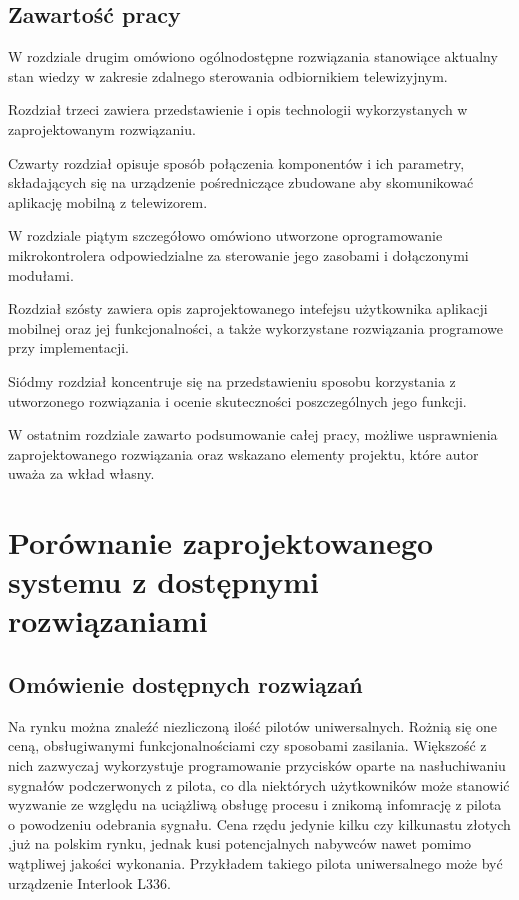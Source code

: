 \documentclass[12pt,twoside,draft]{article}
\begin{document}
\subsection{Zawartość pracy}
W rozdziale drugim  omówiono ogólnodostępne rozwiązania stanowiące aktualny stan wiedzy w zakresie zdalnego sterowania odbiornikiem telewizyjnym.

Rozdział trzeci zawiera przedstawienie i opis technologii wykorzystanych w zaprojektowanym rozwiązaniu.

Czwarty rozdział opisuje sposób połączenia komponentów i ich parametry, składających się na urządzenie pośredniczące zbudowane aby skomunikować aplikację mobilną z telewizorem.

W rozdziale piątym szczegółowo omówiono utworzone oprogramowanie mikrokontrolera odpowiedzialne za sterowanie jego zasobami i dołączonymi modułami.

Rozdział szósty zawiera opis zaprojektowanego intefejsu użytkownika aplikacji mobilnej oraz jej funkcjonalności, a także wykorzystane rozwiązania programowe przy implementacji.

Siódmy rozdział koncentruje się na przedstawieniu sposobu korzystania z utworzonego rozwiązania i ocenie skuteczności poszczególnych jego funkcji.

W ostatnim rozdziale zawarto podsumowanie całej pracy, możliwe usprawnienia zaprojektowanego rozwiązania oraz wskazano elementy projektu, które autor uważa za wkład własny.


\clearpage
\section{Porównanie zaprojektowanego systemu z do\-stęp\-ny\-mi rozwiązaniami}
\subsection{Omówienie dostępnych rozwiązań}
Na rynku można znaleźć niezliczoną ilość pilotów uniwersalnych. Rożnią się one
ceną, obsługiwanymi funkcjonalnościami czy sposobami zasilania. Większość z nich zazwyczaj
wykorzystuje programowanie przycisków oparte na nasłuchiwaniu sygnałów podczerwonych z pilota, co dla niektórych użytkowników może stanowić
wyzwanie ze względu na uciążliwą obsługę procesu i znikomą infomrację z pilota o powodzeniu odebrania sygnału. Cena rzędu jedynie kilku czy kilkunastu złotych
,już na polskim rynku, jednak kusi potencjalnych nabywców nawet pomimo wątpliwej jakości wykonania. Przykładem
takiego pilota uniwersalnego może być urządzenie Interlook L336\cite{cheapController}.
\end{document}
